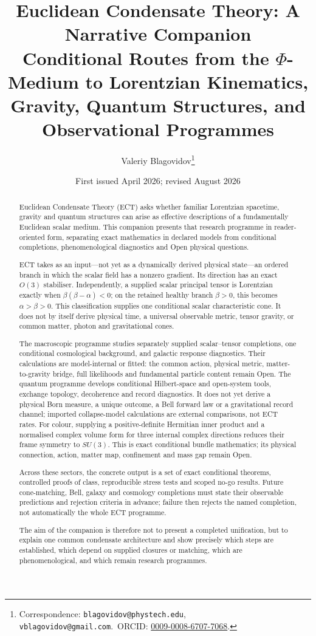 \documentclass[11pt,a4paper]{article}
\title{\textbf{Euclidean Condensate Theory: A Narrative Companion}\\[6pt]
\large Conditional Routes from the $\Phi$-Medium to Lorentzian Kinematics,\\
Gravity, Quantum Structures, and Observational Programmes}
\author{Valeriy Blagovidov\thanks{Correspondence: \texttt{blagovidov@phystech.edu}, \texttt{vblagovidov@gmail.com}.~ORCID: \href{https://orcid.org/0009-0008-6707-7068}{0009-0008-6707-7068}.}}
\date{First issued April 2026; revised August 2026}
\begin{document}
\maketitle

\begin{abstract}
Euclidean Condensate Theory (ECT) asks whether familiar Lorentzian spacetime,
gravity and quantum structures can arise as effective descriptions of a
fundamentally Euclidean scalar medium.  This companion presents that research
programme in reader-oriented form, separating exact mathematics in declared
models from conditional completions, phenomenological diagnostics and Open
physical questions.

ECT takes as an input---not yet as a dynamically derived physical state---an
ordered branch in which the scalar field has a nonzero gradient.  Its direction
has an exact $O(3)$ stabiliser.  Independently, a supplied scalar principal
tensor is Lorentzian exactly when $\beta(\beta-\alpha)<0$; on the retained
healthy branch $\beta>0$, this becomes $\alpha>\beta>0$.  This classification
supplies one conditional scalar characteristic cone.  It does not by itself
derive physical time, a universal observable metric, tensor gravity, or common
matter, photon and gravitational cones.

The macroscopic programme studies separately supplied scalar--tensor
completions, one conditional cosmological background, and galactic response
diagnostics.  Their calculations are model-internal or fitted: the common
action, physical metric, matter-to-gravity bridge, full likelihoods and
fundamental particle content remain Open.  The quantum programme develops
conditional Hilbert-space and open-system tools, exchange topology,
decoherence and record diagnostics.  It does not yet derive a physical Born
measure, a unique outcome, a Bell forward law or a gravitational record
channel; imported collapse-model calculations are external comparisons, not
ECT rates.  For colour, supplying a positive-definite Hermitian inner product
and a normalised complex volume form for three internal complex directions
reduces their frame symmetry to $SU(3)$.  This is exact conditional bundle mathematics;
its physical connection, action, matter map, confinement and mass gap remain
Open.

Across these sectors, the concrete output is a set of exact conditional
theorems, controlled proofs of class, reproducible stress tests and scoped
no-go results.  Future cone-matching, Bell, galaxy and cosmology completions
must state their observable predictions and rejection criteria in advance;
failure then rejects the named completion, not automatically the whole ECT
programme.

The aim of the companion is therefore not to present a completed unification,
but to explain one common condensate architecture and show precisely which
steps are established, which depend on supplied closures or matching, which
are phenomenological, and which remain research programmes.
\end{abstract}
\end{document}
